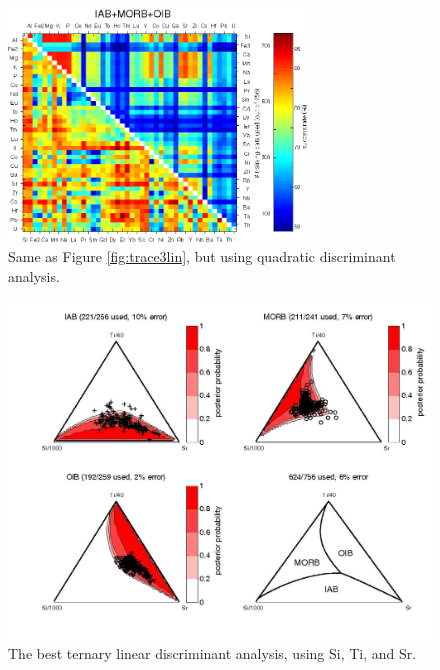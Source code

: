 \begin{figure}[htbp]
  \includegraphics[width=300]{figures/xPlotTrace3Ti_quadratic_err.jpg}
  \caption[Same as  Figure \ref{fig:trace3lin}, but  using quadratic discriminant analysis]
{Same as  Figure \ref{fig:trace3lin}, but  using quadratic discriminant analysis.}
  \label{fig:trace3quad}
\end{figure}

\clearpage

\begin{figure}[htbp]
  \centering
  \includegraphics[width=600]{figures/Si_Ti_Sr_lin.jpg}
  \caption[Best ternary linear discriminant analysis (using Si, Ti, and Sr)]{
The best ternary linear discriminant analysis, using Si, Ti, and Sr.}
  \label{fig:Si_Ti_Sr_lin}
\end{figure}

